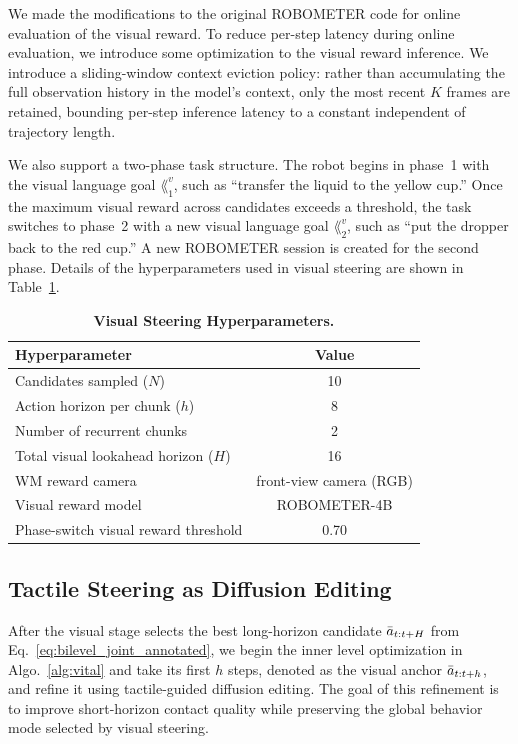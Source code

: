 We made the modifications to the original ROBOMETER code for online evaluation of the visual reward.  To reduce per-step latency during online evaluation, we introduce some optimization to the visual reward inference. We introduce a sliding-window context eviction policy: rather than
  accumulating the full observation history in the model's context, only the most recent $K$ frames are retained, bounding per-step inference latency to a constant independent of trajectory length.

We also support a two-phase task structure. The robot begins in phase~1 with the visual language goal $\lang_1^v$, such as ``transfer the liquid to the yellow cup.'' Once the maximum visual reward across candidates exceeds a threshold, the task switches to phase~2 with a new visual language goal $\lang_2^v$, such as ``put the dropper back to the red cup.'' A new ROBOMETER session is created for the second phase. Details of the hyperparameters used in visual steering are shown in Table~\ref{tab:visual_guidance}.

\begin{table}[h]
\centering
\caption{\textbf{Visual Steering Hyperparameters.}}
\label{tab:visual_guidance}
\begin{tabular}{lc}
\toprule
\textbf{Hyperparameter} & \textbf{Value} \\
\midrule
Candidates sampled ($N$) & 10 \\
Action horizon per chunk ($h$) & 8 \\
Number of recurrent chunks & 2 \\
Total visual lookahead horizon ($H$) & 16 \\
WM reward camera & front-view camera (RGB) \\
Visual reward model & ROBOMETER-4B \\
Phase-switch visual reward threshold & 0.70 \\

\bottomrule
\end{tabular}
\end{table}

\subsection{Tactile Steering as Diffusion Editing}
\label{app:implement_tactile_steering}
\label{app:tactile_guidance}

After the visual stage selects the best long-horizon candidate 
$\bar{a}_{t:t+H}$ from Eq.~\ref{eq:bilevel_joint_annotated}, we begin the inner level optimization in Algo.~\ref{alg:vital} and take its first
$h$ steps, denoted as the visual anchor $\bar{a}_{t:t+h}$, and refine it
using tactile-guided diffusion editing. The goal of this refinement is to improve
short-horizon contact quality while preserving the global behavior mode selected
by visual steering.

